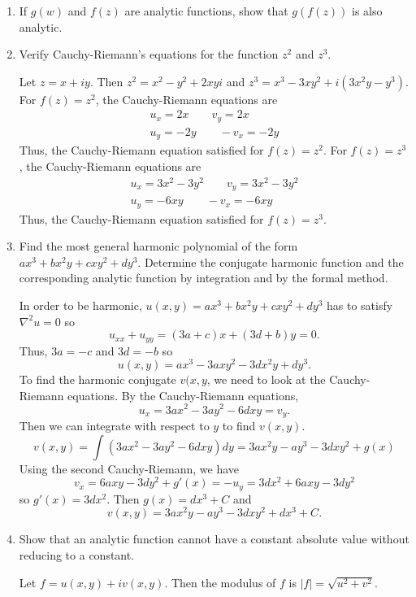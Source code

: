 \begin{enumerate}
\item
  If \(g(w)\) and \(f(z)\) are analytic functions, show that \(g(f(z))\) is
  also analytic.  
\item
  Verify Cauchy-Riemann's equations for the function \(z^2\) and \(z^3\).
  \par\smallskip
  Let \(z = x + iy\).
  Then \(z^2 = x^2 - y^2 + 2xyi\) and
  \(z^3 = x^3 - 3xy^2 + i(3x^2y - y^3)\).
  For \(f(z) = z^2\), the Cauchy-Riemann equations are
  \begin{gather*}
    u_x = 2x \qquad v_y = 2x\\
    u_y = -2y \qquad -v_x = -2y
  \end{gather*}
  Thus, the Cauchy-Riemann equation satisfied for \(f(z) = z^2\).
  For \(f(z) = z^3\), the Cauchy-Riemann equations are
  \begin{gather*}
    u_x = 3x^2 - 3y^2 \qquad v_y = 3x^2 - 3y^2\\
    u_y = -6xy \qquad -v_x = -6xy
  \end{gather*}
  Thus, the Cauchy-Riemann equation satisfied for \(f(z) = z^3\).
\item
  Find the most general harmonic polynomial of the form
  \(ax^3 + bx^2y + cxy^2 + dy^3\).
  Determine the conjugate harmonic function and the corresponding analytic
  function by integration and by the formal method.
  \par\smallskip
  In order to be harmonic, \(u(x,y) = ax^3 + bx^2y + cxy^2 + dy^3\) has to
  satisfy \(\nabla^2u = 0\) so
  \[
  u_{xx} + u_{yy} = (3a + c)x + (3d + b)y = 0.
  \]
  Thus, \(3a = -c\) and \(3d = -b\) so
  \[
  u(x,y) = ax^3 - 3axy^2 - 3dx^2y + dy^3.
  \]
  To find the harmonic conjugate \(v(x,y\), we need to look at the
  Cauchy-Riemann equations.
  By the Cauchy-Riemann equations,
  \[
  u_x = 3ax^2 - 3ay^2 - 6dxy = v_y.
  \]
  Then we can integrate with respect to \(y\) to find \(v(x,y)\).
  \[
  v(x,y) = \int(3ax^2 - 3ay^2 - 6dxy)dy = 3ax^2y - ay^3 - 3dxy^2 + g(x)
  \]
  Using the second Cauchy-Riemann, we have
  \[
  v_x = 6axy - 3dy^2 + g'(x) = -u_y = 3dx^2 + 6axy - 3dy^2
  \]
  so \(g'(x) = 3dx^2\).
  Then \(g(x) = dx^3 + C\) and
  \[
  v(x,y) = 3ax^2y - ay^3 - 3dxy^2 + dx^3 + C.
  \]
\item
  Show that an analytic function cannot have a constant absolute value without
  reducing to a constant.
  \par\smallskip
  Let \(f = u(x,y) + iv(x,y)\).
  Then the modulus of \(f\) is \(\lvert f\rvert = \sqrt{u^2 + v^2}\).

\end{enumerate}
